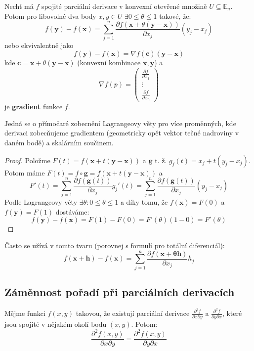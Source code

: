 \documentclass[../main.tex]{subfiles}
\begin{document}
\begin{theorem}\label{lagrange1}
	Nechť má $f$ spojité parciální derivace v konvexní otevřené množině $U \subseteq \mathbb{E}_{n}$.
	Potom pro libovolné dva body $x,y \in U$ $\exists 0 \leq \theta \leq 1$ takové, že:
	\[ f(\mathbf{y}) - f(\mathbf{x}) = \sum^{n}_{j=1} \frac{\partial f(\mathbf{x} + \theta (\mathbf{y}-\mathbf{x}))}{\partial x_j}(y_j - x_j) \]
	nebo ekvivalentně jako
	\[ f(\mathbf{y}) - f(\mathbf{x}) = \nabla f(\textbf{c}) (\textbf{y} - \textbf{x}) \]
	kde \(\textbf{c} = \mathbf{x} + \theta (\mathbf{y}-\mathbf{x})\) (konvexní kombinace \(\mathbf{x},\mathbf{y}\))
	a \[\nabla f(p) = \begin{pmatrix} \frac{\partial f}{\partial x_1} \\[6pt] \vdots \\[6pt] \frac{\partial f}{\partial x_n} \end{pmatrix}\] je \textbf{gradient} funkce \(f\).
\end{theorem}

\begin{intuition}
	Jedná se o přímočaré zobecnění Lagrangeovy věty pro více proměnných, kde derivaci zobecňujeme gradientem (geometricky opět vektor tečné nadroviny v daném bodě) a skalárním součinem.
\end{intuition}

\begin{proof}
	Položme $F(t) = f(\mathbf{x} + t(\mathbf{y} - \mathbf{x}))$ a $\mathbf{g}$ t. ž. $g_j(t) = x_j + t(y_j - x_j)$.
	Potom máme $F(t) = f \circ \mathbf{g} = f(\mathbf{x} + t(\mathbf{y}-\mathbf{x}))$ a
	\[ F'(t) = \sum^{n}_{j=1} \frac{\partial f(\mathbf{g}(t))}{\partial x_j}g_j'(t) =
	\sum^{n}_{j=1} \frac{\partial f(\mathbf{g}(t))}{\partial x_j}(y_j - x_j)  \]
	Podle Lagrangeovy věty $\exists \theta : 0 \leq \theta \leq 1$ a díky tomu, že $f(\mathbf{x}) = F(0)$ a $f(\mathbf{y}) = F(1)$ dostáváme:
	\[ f(\mathbf{y}) - f(\mathbf{x}) = F(1) - F(0) = F'(\theta)(1 - 0) = F'(\theta) \]
\end{proof}


\begin{remark}
	Často se užívá v tomto tvaru (porovnej s formulí pro totální diferenciál):
	\[ f(\mathbf{x} + \mathbf{h}) - f(\mathbf{x}) =
	\sum^{n}_{j=1} \frac{\partial f(\mathbf{x + \theta \mathbf{h}})}{\partial x_j}h_j \]
\end{remark}

\subsection{Záměnnost pořadí při parciálních derivacích}
\begin{lemma}[O záměnnosti]
	Mějme funkci $f(x,y)$ takovou, že existují parciální derivace
	$\frac{\partial ^2 f}{\partial x \partial y}$ a $\frac{\partial ^2 f}{\partial y \partial x}$, které
	jsou spojité v nějakém okolí bodu $(x,y)$. Potom:
	\[ \frac{\partial ^2 f(x,y)}{\partial x \partial y} = \frac{\partial ^2 f(x,y)}{\partial y \partial x} \]
\end{lemma}
\end{document}

